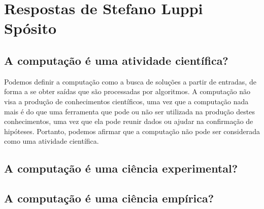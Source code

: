 \section{Respostas de Stefano Luppi Spósito}

\subsection{A computação é uma atividade científica?}
Podemos definir a computação como a busca de soluções a partir de entradas, de forma a se obter saídas que são processadas por algoritmos. A computação não visa a produção de conhecimentos científicos, uma vez que a computação nada mais é do que uma ferramenta que pode ou não ser utilizada na produção destes conhecimentos, uma vez que ela pode reunir dados ou ajudar na confirmação de hipóteses.
Portanto, podemos afirmar que a computação não pode ser considerada como uma atividade científica.
\subsection{A computação é uma ciência experimental?}

\subsection{A computação é uma ciência empírica?}